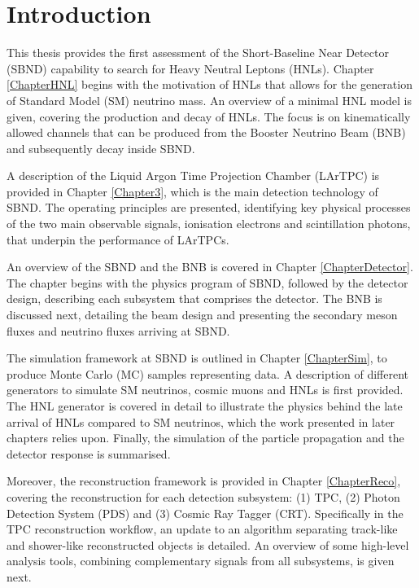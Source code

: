 
\chapter{Introduction}  %

This thesis provides the first assessment of the Short-Baseline Near Detector (SBND) capability to search for Heavy Neutral Leptons (HNLs).
Chapter \ref{ChapterHNL} begins with the motivation of HNLs that allows for the generation of Standard Model (SM) neutrino mass.
An overview of a minimal HNL model is given, covering the production and decay of HNLs.
The focus is on kinematically allowed channels that can be produced from the Booster Neutrino Beam (BNB) and subsequently decay inside SBND.

A description of the Liquid Argon Time Projection Chamber (LArTPC) is provided in Chapter \ref{Chapter3}, which is the main detection technology of SBND.
The operating principles are presented, identifying key physical processes of the two main observable signals, ionisation electrons and scintillation photons, that underpin the performance of LArTPCs.

An overview of the SBND and the BNB is covered in Chapter \ref{ChapterDetector}.
The chapter begins with the physics program of SBND, followed by the detector design, describing each subsystem that comprises the detector.
The BNB is discussed next, detailing the beam design and presenting the secondary meson fluxes and neutrino fluxes arriving at SBND.

The simulation framework at SBND is outlined in Chapter \ref{ChapterSim}, to produce Monte Carlo (MC) samples representing data.
A description of different generators to simulate SM neutrinos, cosmic muons and HNLs is first provided.
The HNL generator is covered in detail to illustrate the physics behind the late arrival of HNLs compared to SM neutrinos, which the work presented in later chapters relies upon.  
Finally, the simulation of the particle propagation and the detector response is summarised.

Moreover, the reconstruction framework is provided in Chapter \ref{ChapterReco}, covering the reconstruction for each detection subsystem: (1) TPC, (2) Photon Detection System (PDS) and (3) Cosmic Ray Tagger (CRT).
Specifically in the TPC reconstruction workflow, an update to an algorithm separating track-like and shower-like reconstructed objects is detailed.
An overview of some high-level analysis tools, combining complementary signals from all subsystems, is given next. 
                                                                                                                       
